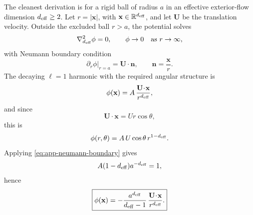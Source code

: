 \documentclass[11pt]{article}
\begin{document}
The cleanest derivation is for a rigid ball of radius \(a\) in an effective exterior-flow
dimension \(d_{\rm eff}\ge 2\). Let \(r=|\mathbf x|\), with \(\mathbf x\in\mathbb R^{d_{\rm eff}}\),
and let \(\mathbf U\) be the translation velocity. Outside the excluded ball \(r>a\), the
potential solves
\begin{equation}
\nabla_{d_{\rm eff}}^2 \phi = 0,
\qquad
\phi\to 0 \quad \text{as } r\to\infty,
\label{eq:app-laplace-d}
\end{equation}
with Neumann boundary condition
\begin{equation}
\partial_r \phi\big|_{r=a}=\mathbf U\!\cdot\!\mathbf n,
\qquad
\mathbf n=\frac{\mathbf x}{r}.
\label{eq:app-neumann-boundary}
\end{equation}
The decaying \(\ell=1\) harmonic with the required angular structure is
\begin{equation}
\phi(\mathbf x)
=
A\,\frac{\mathbf U\!\cdot\!\mathbf x}{r^{d_{\rm eff}}},
\label{eq:app-harmonic-ansatz}
\end{equation}
and since
\begin{equation}
\mathbf U\!\cdot\!\mathbf x
=
Ur\cos\theta,
\end{equation}
this is
\begin{equation}
\phi(r,\theta)=A\,U\cos\theta\,r^{1-d_{\rm eff}}.
\end{equation}
Applying \eqref{eq:app-neumann-boundary} gives
\begin{equation}
A(1-d_{\rm eff})a^{-d_{\rm eff}}=1,
\end{equation}
hence
\begin{equation}
\boxed{
\phi(\mathbf x)
=
-\frac{a^{d_{\rm eff}}}{d_{\rm eff}-1}\,
\frac{\mathbf U\!\cdot\!\mathbf x}{r^{d_{\rm eff}}}.
}
\label{eq:app-general-potential}
\end{equation}
\end{document}
